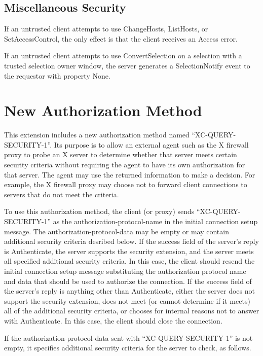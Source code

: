 \subsection{Miscellaneous Security}

If an untrusted client attempts to use ChangeHosts, ListHosts, or
SetAccessControl, the only effect is that the client receives an
Access error.

If an untrusted client attempts to use ConvertSelection on a selection
with a trusted selection owner window, the server generates a
SelectionNotify event to the requestor with property None.

\section{New Authorization Method}

This extension includes a new authorization method named
``XC-QUERY-SECURITY-1''.  Its purpose is to allow an external agent such
as the X firewall proxy to probe an X server to determine whether that
server meets certain security criteria without requiring the agent to
have its own authorization for that server.  The agent may use the
returned information to make a decision.  For example, the X firewall
proxy may choose not to forward client connections to servers that do
not meet the criteria.

To use this authorization method, the client (or proxy) sends
``XC-QUERY-SECURITY-1'' as the authorization-protocol-name in the
initial connection setup message.  The authorization-protocol-data may
be empty or may contain additional security criteria desribed below.
If the success field of the server's reply is Authenticate, the server
supports the security extension, and the server meets all specified
additional security criteria.  In this case, the client should resend
the initial connection setup message substituting the authorization
protocol name and data that should be used to authorize the
connection.  If the success field of the server's reply is anything
other than Authenticate, either the server does not support the
security extension, does not meet (or cannot determine if it meets)
all of the additional security criteria, or chooses for internal
reasons not to answer with Authenticate.  In this case, the client
should close the connection.

If the authorization-protocol-data sent with ``XC-QUERY-SECURITY-1'' is
not empty, it specifies additional security criteria for the server to
check, as follows.

